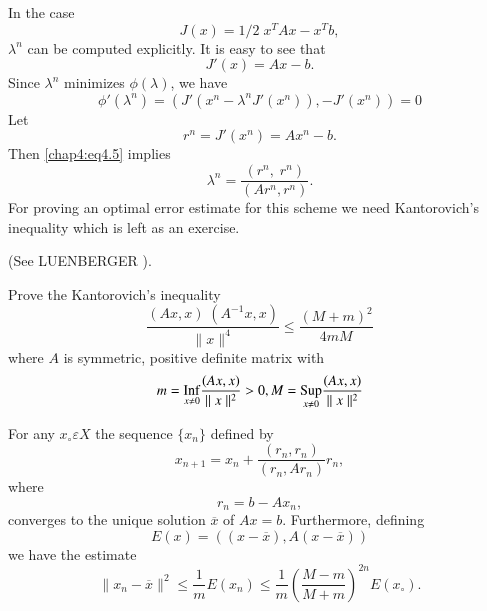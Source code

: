 In the case
$$
J(x)=1/2\; x^T Ax-x^Tb,
$$
$\lambda^n$ can be computed explicitly. It is easy to see that 
$$
J'(x)=Ax-b.
$$
Since $\lambda^n$ minimizes $\phi(\lambda)$, we have 
\begin{equation}\label{chap4:eq4.5}
\phi'(\lambda^n)=\left(J'(x^n-\lambda^n J'(x^n)), -J'(x^n)\right)=0
\end{equation}
Let
$$
r^n=J'(x^n)=Ax^n-b.
$$
Then \eqref{chap4:eq4.5} implies
\begin{equation}\label{chap4:eq4.6}
\lambda^n=\frac{(r^n,\; r^n)}{(Ar^n, r^n)}.
\end{equation}
For proving an optimal error estimate for this scheme we need
Kantorovich's inequality which is left as an exercise.

\setcounter{exercise}{0}
\begin{exercise}\label{chap4:exr1}
(See LUENBERGER \cite{key30}).

Prove the Kantorovich's inequality 
\begin{equation}\label{chap4:eq4.7}
\frac{(Ax, x)\;(A^{-1}x, x)}{\parallel x\parallel^4}\leq
\frac{(M+m)^2}{4mM}
\end{equation}
where $A$ is symmetric, positive definite matrix with 
$$
m=\underset{x\neq 0}{\operatorname{Inf}}\frac{(Ax,x)}{\parallel x\parallel^2}>0, M=
\underset{x\neq 0}{\operatorname{Sup}}\frac{(Ax, x)}{\parallel x\parallel^2}
$$
\end{exercise}

\setcounter{THM}{0}
\begin{THM}\label{chap4:THM1}
For any $x_\circ \varepsilon X$ the sequence $\{x_n\}$ defined by 
$$
x_{n+1}=x_n+\frac{(r_n,r_n)}{(r_n, Ar_n)}r_n,
$$\pageoriginale
where
$$
r_n=b-Ax_n,
$$
converges to the unique solution $\overline{x}$ of
$Ax=b$. Furthermore, defining
$$
E(x)=((x-\overline{x}), A(x-\overline{x})) 
$$
we have the estimate
$$
\parallel x_n-\overline{x}\parallel^2\leq\frac{1}{m} E(x_n)\leq
\frac{1}{m}\left(\frac{M-m}{M+m}\right)^{2n}E(x_\circ).
$$
\end{THM}

